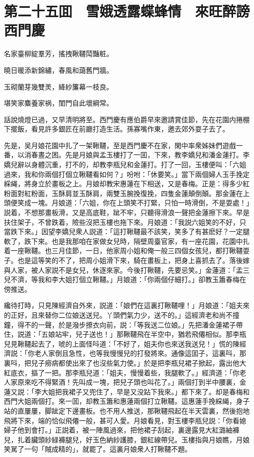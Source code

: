 
\chapter*{第二十五囬　雪娥透露蝶蜂情　來旺醉謗西門慶}

名家臺柳綻羣芳，搖拽鞦韆鬦豔粧。

曉日暖添新錦繡，春風和藹舊門牆。

玉砌蘭芽幾雙羙，絳紗簾幕一枝良。

堪笑家麋養家祸，閨門自此壞綱常。

話說燒燈已過，又早清明將至。西門慶有應伯爵早來邀請賞佳節，先在花園内捲棚下擺飯，看見許多銀匠在前廳打造生活。孫寡嘴作東，邀去郊外耍子去了。

先是，吴月娘花園中扎了一架鞦韆，至是西門慶不在家，閑中率衆姊妹們遊戲一番，以消春晝之困。先是月娘與孟玉樓打了一囬，下來，教李嬌兒和潘金蓮打。李嬌兒辭以身體沉重，打不的，却教李瓶兒和金蓮打。打了一回，玉樓便叫：「六姐過來，我和你兩個打個立鞦韆看如何？」吩咐：「休要笑。」當下兩個婦人玉手挽定綵䋲，將身立於畫板之上。月娘却教宋惠蓮在下相送，又是春梅。正是：得多少紅粉面對紅粉面，玉酥肩並玉酥肩，兩雙玉腕挽復挽，四隻金蓮顛倒顛。那金蓮在上頭便笑成一塊。月娘道：「六姐，你在上頭笑不打緊，只怕一時滑倒，不是耍處！」説着，不想那畫板滑，又是高底鞋，跐不牢，只聽得滑浪一聲把金蓮擦下來。早是扶住架子，不曾跌着，險些沒把玉樓也拖下來。月娘道：「我説六姐笑的不好，只當跌下來。」因望李嬌兒衆人説道：「這打鞦韆最不該笑，笑多了有甚麽好？一定腿軟了，跌下來。也是我那咱在家做女兒時，隔壁周臺官家，有一座花園，花園中扎着一座鞦韆。也三月佳節，一日，他家周小姐和俺一般三四個女孩兒，都打鞦韆耍子。也是這等笑的不了，把周小姐滑下來，騎在畫板上，把身上喜抓去了。落後嫁與人家，被人家説不是女兒，休逐來家。今後打鞦韆，先要忌笑。」金蓮道：「孟三兒不濟，等我和李大姐打個立鞦韆。」月娘道：「你兩個仔細打。」卻教玉簫春梅在傍推送。

纔待打時，只見陳經濟自外來，説道：「娘們在這裏打鞦韆哩！」月娘道：「姐夫來的正好，且來替你二位娘送送兒。丫頭們氣力少，送不的。」這經濟老和尚不撞鐘，得不的一聲，於是潑步撩衣向前，説：「等我送二位娘。」先把潘金蓮裙子帶住，説道：「五娘站牢，兒子送也！」那鞦韆飛在半空中，猶若飛僊相似。那李瓶兒見鞦韆起去了，唬的上面怪呌道：「不好了，姐夫你也來送我送兒！」慌的陳經濟説：「你老人家倒且急性，也等我慢慢兒的打發將來。通像這囬子，這裏呌，那裏呌，把兒子癆病都使出來了也沒些氣力使。」於是把李瓶兒裙子掀起，露出他大紅底衣，摳了一把。那李瓶兒道：「姐夫，慢慢着些，我腿軟了。」經濟道：「你老人家原來吃不得緊酒！先叫成一塊，把兒子頭也叫花了。」兩個打到半中腰裏，金蓮又説：「李大姐把我裙子又兜住了，早是又没跕下我來。」都下來了。却是春梅和西門大姐兩個打。來一囬，却教玉簫和惠蓮兩個打立鞦韆。這惠蓮手挽綵䋲，身子站的直屢屢，脚跐定下邊畫板。也不用人推送，那鞦韆飛起在半天雲裏，然後抱地飛將下來，端的恰似飛僊一般，甚可人愛。月娘看見，對玉樓李瓶兒説：「你看媳婦子他到會打。」正説着，被一陣風過來，把他裙子刮起，裏邊露見大紅潞紬褲兒，扎着臟頭紗緑褲腿兒，好玉色納紗護膝，銀紅線帶兒。玉樓指與月娘瞧，月娘笑駡了一句「賊成精的」，就罷了。這裏月娘衆人打鞦韆不題。

